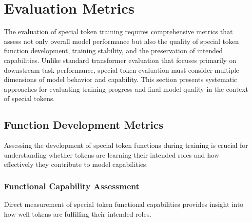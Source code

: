 
\section{Evaluation Metrics}

The evaluation of special token training requires comprehensive metrics that assess not only overall model performance but also the quality of special token function development, training stability, and the preservation of intended capabilities. Unlike standard transformer evaluation that focuses primarily on downstream task performance, special token evaluation must consider multiple dimensions of model behavior and capability. This section presents systematic approaches for evaluating training progress and final model quality in the context of special tokens.

\subsection{Function Development Metrics}

Assessing the development of special token functions during training is crucial for understanding whether tokens are learning their intended roles and how effectively they contribute to model capabilities.

\subsubsection{Functional Capability Assessment}

Direct measurement of special token functional capabilities provides insight into how well tokens are fulfilling their intended roles.

